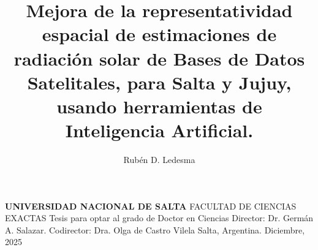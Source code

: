 \documentclass[letterpaper,12pt, twoside]{report}
\title{Mejora de la representatividad espacial de estimaciones de radiación solar de Bases
de Datos Satelitales, para Salta y Jujuy, usando herramientas de Inteligencia Artificial.} %
\author{Rubén D. Ledesma} %
\makeatletter
\let\newtitle\@title
\let\newauthor\@author
\providecommand{\DIFdeltex}[1]{{\protect\color{red} \scriptsize #1}} %
\providecommand{\DIFaddbegin}{} %
\providecommand{\DIFaddend}{} %
\providecommand{\DIFdelbegin}{} %
\providecommand{\DIFdelend}{} %
\providecommand{\DIFdel}[1]{\texorpdfstring{\DIFdeltex{#1}}{}} %
\newcommand{\DIFscaledelfig}{0.5}
\newlength{\DIFdelgraphicswidth} %
\newlength{\DIFdelgraphicsheight} %
\newcommand{\DIFaddincludegraphics}[2][]{{\color{blue}\fbox{\DIFOincludegraphics[#1]{#2}}}} %
\newcommand{\DIFdelincludegraphics}[2][]{%
\sbox{\DIFdelgraphicsbox}{\DIFOincludegraphics[#1]{#2}}%
\settoboxwidth{\DIFdelgraphicswidth}{\DIFdelgraphicsbox} %
\settoboxtotalheight{\DIFdelgraphicsheight}{\DIFdelgraphicsbox} %
\scalebox{\DIFscaledelfig}{%
\parbox[b]{\DIFdelgraphicswidth}{\usebox{\DIFdelgraphicsbox}\\[-\baselineskip] \rule{\DIFdelgraphicswidth}{0em}}\llap{\resizebox{\DIFdelgraphicswidth}{\DIFdelgraphicsheight}{%
\setlength{\unitlength}{\DIFdelgraphicswidth}%
\begin{picture}(1,1)%
\thicklines\linethickness{2pt} %
{\color[rgb]{1,0,0}\put(0,0){\framebox(1,1){}}}%
{\color[rgb]{1,0,0}\put(0,0){\line( 1,1){1}}}%
{\color[rgb]{1,0,0}\put(0,1){\line(1,-1){1}}}%
\end{picture}%
}\hspace*{3pt}}} %
} %
\DeclareRobustCommand{\DIFaddbegin}{\DIFOaddbegin \let\includegraphics\DIFaddincludegraphics} %
\DeclareRobustCommand{\DIFaddend}{\DIFOaddend \let\includegraphics\DIFOincludegraphics} %
\DeclareRobustCommand{\DIFdelbegin}{\DIFOdelbegin \let\includegraphics\DIFdelincludegraphics} %
\DeclareRobustCommand{\DIFdelend}{\DIFOaddend \let\includegraphics\DIFOincludegraphics} %
\makeatother
\begin{document}
\DIFdelbegin %
\DIFdel{\textbf{UNIVERSIDAD NACIONAL DE SALTA}}%
\DIFdel{FACULTAD DE CIENCIAS EXACTAS}%
\DIFdel{\textbf{\MakeUppercase{\newtitle}}}%
\DIFdel{Tesis para optar al grado de Doctor en Ciencias }%
\DIFdel{\textbf{\MakeUppercase{\newauthor}}}%
\DIFdel{Director: Dr. Germán A. Salazar.}%
        \DIFdel{Codirector: Dra. Olga de Castro Vilela}%
\DIFdel{Salta, Argentina.}%
\DIFdel{Diciembre, 2025 %
    }%
\DIFdelend \DIFaddbegin  \DIFaddend %
\end{document}
